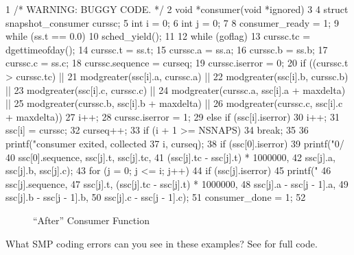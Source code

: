 { \fontsize{6.5pt}{7.5pt}\selectfont
\begin{verbbox}
  1 /* WARNING: BUGGY CODE. */
  2 void *consumer(void *ignored)
  3 {
  4   struct snapshot_consumer curssc;
  5   int i = 0;
  6   int j = 0;
  7
  8   consumer_ready = 1;
  9   while (ss.t == 0.0) {
 10     sched_yield();
 11   }
 12   while (goflag) {
 13     curssc.tc = dgettimeofday();
 14     curssc.t = ss.t;
 15     curssc.a = ss.a;
 16     curssc.b = ss.b;
 17     curssc.c = ss.c;
 18     curssc.sequence = curseq;
 19     curssc.iserror = 0;
 20     if ((curssc.t > curssc.tc) ||
 21         modgreater(ssc[i].a, curssc.a) ||
 22         modgreater(ssc[i].b, curssc.b) ||
 23         modgreater(ssc[i].c, curssc.c) ||
 24         modgreater(curssc.a, ssc[i].a + maxdelta) ||
 25         modgreater(curssc.b, ssc[i].b + maxdelta) ||
 26         modgreater(curssc.c, ssc[i].c + maxdelta)) {
 27       i++;
 28       curssc.iserror = 1;
 29     } else if (ssc[i].iserror)
 30       i++;
 31     ssc[i] = curssc;
 32     curseq++;
 33     if (i + 1 >= NSNAPS)
 34       break;
 35   }
 36   printf("consumer exited, collected %
 37          i, curseq);
 38   if (ssc[0].iserror)
 39     printf("0/%
 40            ssc[0].sequence, ssc[j].t, ssc[j].tc,
 41            (ssc[j].tc - ssc[j].t) * 1000000,
 42            ssc[j].a, ssc[j].b, ssc[j].c);
 43   for (j = 0; j <= i; j++)
 44     if (ssc[j].iserror)
 45       printf("%
 46              ssc[j].sequence,
 47              ssc[j].t, (ssc[j].tc - ssc[j].t) * 1000000,
 48              ssc[j].a - ssc[j - 1].a,
 49              ssc[j].b - ssc[j - 1].b,
 50              ssc[j].c - ssc[j - 1].c);
 51   consumer_done = 1;
 52 }
\end{verbbox}
}
\begin{figure}[htbp]
\centering
\theverbbox
\caption{``After'' Consumer Function}
\label{fig:app:questions:After Consumer Function}
\end{figure}

\QuickQuiz{}
	What SMP coding errors can you see in these examples?
	See  for full code.
 \QuickQuizEnd

